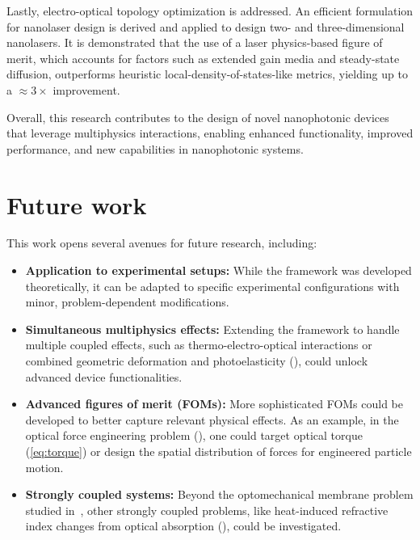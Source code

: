 Lastly, electro-optical topology optimization is addressed. An efficient formulation for nanolaser design is derived and applied to design two- and three-dimensional nanolasers. It is demonstrated that the use of
 a laser physics-based figure of merit, which accounts for factors such as extended gain media and steady-state diffusion, outperforms
  heuristic local-density-of-states-like metrics, yielding up to a $\approx 3\times$ improvement.

Overall, this research contributes to the design of novel nanophotonic devices that leverage multiphysics interactions, enabling enhanced functionality, improved performance, and new capabilities in nanophotonic systems.

\section{Future work}

This work opens several avenues for future research, including:

\begin{itemize}
    \item \textbf{Application to experimental setups:} While the framework was developed theoretically, it can be adapted to specific experimental configurations with minor, problem-dependent modifications.
    
    
    \item \textbf{Simultaneous multiphysics effects:} Extending the framework to handle multiple coupled effects, such as thermo-electro-optical interactions or combined geometric deformation and photoelasticity (), could unlock advanced device functionalities.
    
    \item \textbf{Advanced figures of merit (FOMs):} More sophisticated FOMs could be developed to better capture relevant physical effects. As an example, in the optical force engineering problem (), one could target optical torque (\eqref{eq:torque}) or design the spatial distribution of forces for engineered particle motion.
    
    \item \textbf{Strongly coupled systems:} Beyond the optomechanical membrane problem studied in~, other strongly coupled problems, like heat-induced refractive index changes from optical absorption (), could be investigated.
    
\end{itemize}